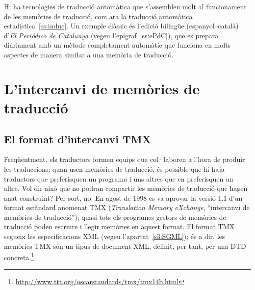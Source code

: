 Hi ha tecnologies de traducció automàtica que s'assemblen molt
al funcionament de les memòries de traducció, com ara la traducció
automàtica estadística~\ref{ss:induc}. Un exemple clàssic és l'edició
bilingüe (espanyol--català) d'\emph{El Periódico de Catalunya} (vegeu
l'epígraf~\ref{ss:ePdC}), que es prepara diàriament amb un mètode
completament automàtic que funciona en molts aspectes de manera
similar a una memòria de traducció.



\section{L'intercanvi de memòries de traducció}

\subsection{El format d'intercanvi TMX}


Freqüentment, els traductors formen equips que col·laboren a l'hora de
produir les traduccions; quan usen memòries de traducció, és possible
que hi haja traductors que preferisquen un programa i uns altres que
en preferisquen un altre. Vol dir això que no podran compartir les
memòries de traducció que hagen anat construint? Per sort, no. En
agost de 1998 es va aprovar la versió 1.1 d'un format estàndard
anomenat TMX (\emph{Translation Memory eXchange}, ``intercanvi de
memòries de traducció''); quasi tots els programes gestors de memòries
de traducció poden escriure i llegir memòries en aquest format.  El
format TMX segueix les especificacions XML (vegeu
l'apartat~\ref{s3:SGML}); és a dir, les memòries TMX són un tipus de
document XML, definit, per tant, per una DTD concreta.\footnote{\url{http://www.ttt.org/oscarstandards/tmx/tmx14b.html}}

